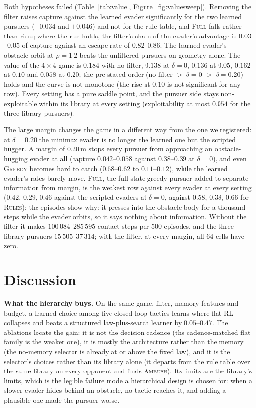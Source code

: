 \documentclass[conference]{IEEEtran}
\newcommand{\pol}[1]{\textsc{#1}}
\begin{document}
Both hypotheses failed (Table~\ref{tab:value}, Figure~\ref{fig:valuesweep}). Removing the filter raises capture against the learned evader significantly for the two learned pursuers ($+0.034$ and $+0.046$) and not for the rule table, and \pol{Full} falls rather than rises; where the rise holds, the filter's share of the evader's advantage is $0.03$--$0.05$ of capture against an escape rate of $0.82$--$0.86$. The learned evader's obstacle orbit at $\rho=1.2$ beats the unfiltered pursuers on geometry alone. The value of the $4\times4$ game is $0.184$ with no filter, $0.138$ at $\delta=0$, $0.136$ at $0.05$, $0.162$ at $0.10$ and $0.058$ at $0.20$; the pre-stated order (no filter $>$ $\delta=0$ $>$ $\delta=0.20$) holds and the curve is not monotone (the rise at $0.10$ is not significant for any row). Every setting has a pure saddle point, and the pursuer side stays non-exploitable within its library at every setting (exploitability at most $0.054$ for the three library pursuers).

The large margin changes the game in a different way from the one we registered: at $\delta=0.20$ the minimax evader is no longer the learned one but the scripted hugger. A margin of 0.20\,m stops every pursuer from approaching an obstacle-hugging evader at all (capture $0.042$--$0.058$ against $0.38$--$0.39$ at $\delta=0$), and even \pol{Greedy} becomes hard to catch ($0.58$--$0.62$ to $0.11$--$0.12$), while the learned evader's rates barely move. \pol{Full}, the full-state greedy pursuer added to separate information from margin, is the weakest row against every evader at every setting ($0.42$, $0.29$, $0.46$ against the scripted evaders at $\delta=0$, against $0.58$, $0.38$, $0.66$ for \pol{Rules}); the episodes show why: it presses into the obstacle body for a thousand steps while the evader orbits, so it says nothing about information. Without the filter it makes $100\,084$--$285\,595$ contact steps per 500 episodes, and the three library pursuers $15\,505$--$37\,314$; with the filter, at every margin, all 64 cells have zero.

\section{Discussion}
\textbf{What the hierarchy buys.} On the same game, filter, memory features and budget, a learned choice among five closed-loop tactics learns where flat RL collapses and beats a structured law-plus-search learner by $0.05$--$0.47$. The ablations locate the gain: it is not the decision cadence (the cadence-matched flat family is the weaker one), it is mostly the architecture rather than the memory (the no-memory selector is already at or above the fixed law), and it is the selector's choices rather than its library alone (it departs from the rule table over the same library on every opponent and finds \pol{Ambush}). Its limits are the library's limits, which is the legible failure mode a hierarchical design is chosen for: when a slower evader hides behind an obstacle, no tactic reaches it, and adding a plausible one made the pursuer worse.
\end{document}
